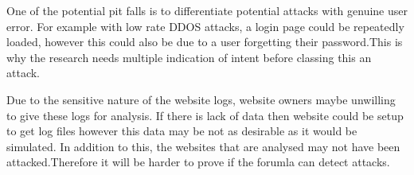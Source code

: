 One of the potential pit falls is to differentiate potential attacks with genuine user error. For example with low rate DDOS attacks, a login page could be repeatedly loaded, however this could also be due to a user forgetting their password.This is why the research needs multiple indication of intent before classing this an attack.  

Due to the sensitive nature of the website logs, website owners maybe unwilling to give these logs for analysis. If there is lack of data then website could be setup to get log files however this data may be not as desirable as it would be simulated. In addition to this, the websites that are analysed may not have been attacked.Therefore it will be harder to prove if the forumla can detect attacks.


